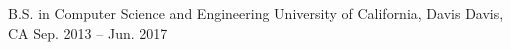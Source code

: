 
\begin{cventries}

  \cventry
    {B.S. in Computer Science and Engineering}
    {University of California, Davis}
    {Davis, CA}
    {Sep. 2013 -- Jun. 2017}
    {}

\end{cventries}
